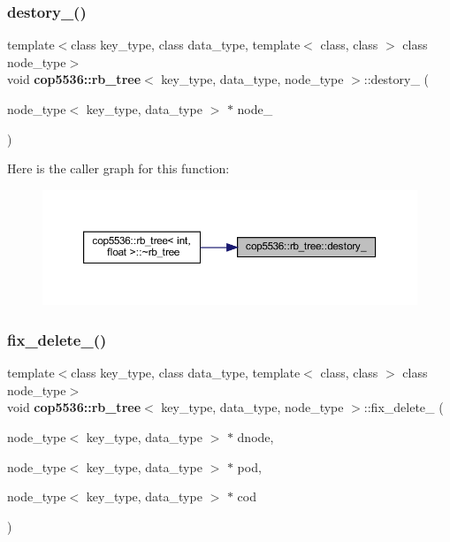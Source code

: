 \subsubsection{destory\_()}
{\footnotesize\ttfamily template$<$class key\+\_\+type, class data\+\_\+type, template$<$ class, class $>$ class node\+\_\+type$>$ \\
void \textbf{ cop5536\+::rb\+\_\+tree}$<$ key\+\_\+type, data\+\_\+type, node\+\_\+type $>$\+::destory\+\_\+ (\begin{DoxyParamCaption}\item[{node\+\_\+type$<$ key\+\_\+type, data\+\_\+type $>$ $\ast$}]{node\+\_\+ }\end{DoxyParamCaption})\hspace{0.3cm}{\ttfamily [inline]}}

Here is the caller graph for this function\+:
\nopagebreak
\begin{figure}[H]
\begin{center}
\leavevmode
\includegraphics[width=350pt]{classcop5536_1_1rb__tree_a9e04d56dd575295b1e01e015aac1f76b_icgraph}
\end{center}
\end{figure}
\mbox{\label{classcop5536_1_1rb__tree_a40e5cba3e23f6e25c330ed16cb9e4943}} 
\subsubsection{fix\_delete\_()}
{\footnotesize\ttfamily template$<$class key\+\_\+type, class data\+\_\+type, template$<$ class, class $>$ class node\+\_\+type$>$ \\
void \textbf{ cop5536\+::rb\+\_\+tree}$<$ key\+\_\+type, data\+\_\+type, node\+\_\+type $>$\+::fix\+\_\+delete\+\_\+ (\begin{DoxyParamCaption}\item[{node\+\_\+type$<$ key\+\_\+type, data\+\_\+type $>$ $\ast$}]{dnode,  }\item[{node\+\_\+type$<$ key\+\_\+type, data\+\_\+type $>$ $\ast$}]{pod,  }\item[{node\+\_\+type$<$ key\+\_\+type, data\+\_\+type $>$ $\ast$}]{cod }\end{DoxyParamCaption})\hspace{0.3cm}{\ttfamily [inline]}}


